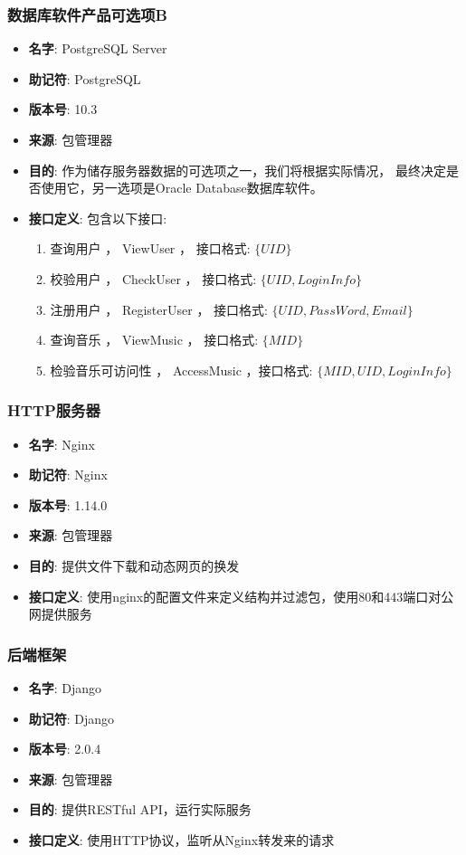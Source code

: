 \begin{enumerate}
\subsubsection{数据库软件产品可选项B} %
\begin{itemize}
	\item \textbf{名字}: 
		PostgreSQL Server
	\item \textbf{助记符}: 
		PostgreSQL
	\item \textbf{版本号}: 
		10.3
	\item \textbf{来源}: 
		包管理器
	\item \textbf{目的}: 
		作为储存服务器数据的可选项之一，我们将根据实际情况，
			最终决定是否使用它，另一选项是Oracle Database数据库软件。
	\item \textbf{接口定义}: 
		包含以下接口: 
		\begin{enumerate}
			\item 查询用户 ， ViewUser   ， 接口格式: $\{ UID \}$
			\item 校验用户 ， CheckUser  ， 接口格式: $\{ UID, LoginInfo \}$
			\item 注册用户 ， RegisterUser  ， 接口格式: $\{ UID,  PassWord, Email\}$
			\item 查询音乐 ， ViewMusic  ， 接口格式: $\{ MID \}$
			\item 检验音乐可访问性 ， AccessMusic ，接口格式:  $\{ MID, UID, LoginInfo \}$ 
		\end{enumerate}
\end{itemize}

\subsubsection{HTTP服务器} %
\begin{itemize}
	\item \textbf{名字}: 
	Nginx
	\item \textbf{助记符}: 
	Nginx
	\item \textbf{版本号}: 
	1.14.0
	\item \textbf{来源}: 
	包管理器
	\item \textbf{目的}: 
	提供文件下载和动态网页的换发
	\item \textbf{接口定义}: 
	使用nginx的配置文件来定义结构并过滤包，使用80和443端口对公网提供服务
\end{itemize}

\subsubsection{后端框架} %
\begin{itemize}
	\item \textbf{名字}: 
	Django
	\item \textbf{助记符}: 
	Django
	\item \textbf{版本号}: 
	2.0.4
	\item \textbf{来源}: 
	包管理器
	\item \textbf{目的}: 
	提供RESTful API，运行实际服务
	\item \textbf{接口定义}: 
	使用HTTP协议，监听从Nginx转发来的请求
\end{itemize}


\end{enumerate}
